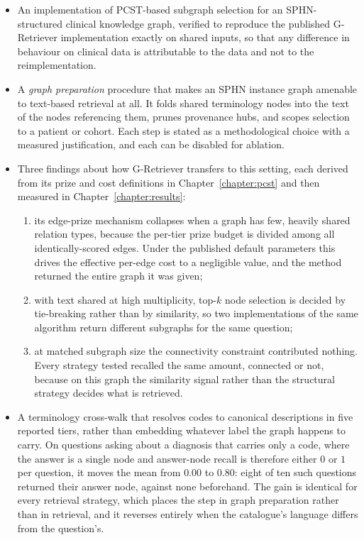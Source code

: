 \begin{itemize}
\item An implementation of PCST-based subgraph selection for an SPHN-structured
clinical knowledge graph, verified to reproduce the published G-Retriever
implementation exactly on shared inputs, so that any difference in behaviour on
clinical data is attributable to the data and not to the reimplementation.

\item A \emph{graph preparation} procedure that makes an SPHN instance graph
amenable to text-based retrieval at all. It folds shared terminology nodes into
the text of the nodes referencing them, prunes provenance hubs, and scopes
selection to a patient or cohort. Each step is stated as a methodological choice
with a measured justification, and each can be disabled for ablation.

\item Three findings about how G-Retriever transfers to this setting, each
derived from its prize and cost definitions in Chapter~\ref{chapter:pcst} and
then measured in Chapter~\ref{chapter:results}:
  \begin{enumerate}
  \item its edge-prize mechanism collapses when a graph has few, heavily shared
  relation types, because the per-tier prize budget is divided among all
  identically-scored edges. Under the published default parameters this drives
  the effective per-edge cost to a negligible value, and the method returned the
  entire graph it was given;
  \item with text shared at high multiplicity, top-$k$ node selection is decided
  by tie-breaking rather than by similarity, so two implementations of the same
  algorithm return different subgraphs for the same question;
  \item at matched subgraph size the connectivity constraint contributed
  nothing. Every strategy tested recalled the same amount, connected or not,
  because on this graph the similarity signal rather than the structural strategy
  decides what is retrieved.
  \end{enumerate}

\item A terminology cross-walk that resolves codes to canonical descriptions in
five reported tiers, rather than embedding whatever label the graph happens to
carry. On questions asking about a diagnosis that carries only a code, where the
answer is a single node and answer-node recall is therefore either $0$ or $1$ per
question, it moves the mean from $0.00$ to $0.80$: eight of ten such questions
returned their answer node, against none beforehand. The gain is identical for
every retrieval strategy, which places the step in graph preparation rather than
in retrieval, and it reverses entirely when the catalogue's language differs from
the question's.


\end{itemize}
